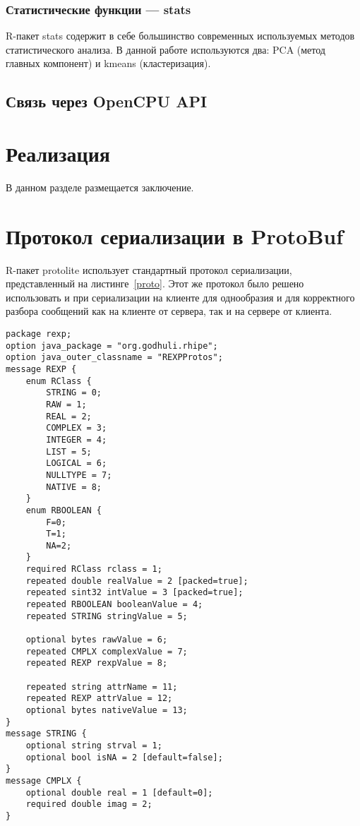 \documentclass[specification,annotation]{itmo-student-thesis}
\begin{document}
\subsection{Статистические функции --- stats}
R-пакет stats \cite{stats} содержит в себе большинство современных используемых методов статистического анализа.
В данной работе используются два: PCA (метод главных компонент) и kmeans (кластеризация).



\section{Связь через OpenCPU API}
\chapterconclusion

\chapter{Реализация}

\chapterconclusion

\startconclusionpage

В данном разделе размещается заключение.

\printmainbibliography

\appendix
\chapter{Протокол сериализации в ProtoBuf}
R-пакет protolite использует стандартный протокол сериализации, представленный на листинге~\ref{proto}. Этот же протокол было решено использовать и при сериализации на клиенте для однообразия и для корректного разбора сообщений как на клиенте от сервера, так и на сервере от клиента.
\begin{lstlisting}[float=!h,caption={Протокол сериализации R-пакета protolite},label={proto}]
package rexp;
option java_package = "org.godhuli.rhipe";
option java_outer_classname = "REXPProtos";
message REXP {
    enum RClass {
        STRING = 0;
        RAW = 1;
        REAL = 2;
        COMPLEX = 3;
        INTEGER = 4;
        LIST = 5;
        LOGICAL = 6;
        NULLTYPE = 7;
        NATIVE = 8;
    }
    enum RBOOLEAN {
        F=0;
        T=1;
        NA=2;
    }
    required RClass rclass = 1;
    repeated double realValue = 2 [packed=true];
    repeated sint32 intValue = 3 [packed=true];
    repeated RBOOLEAN booleanValue = 4;
    repeated STRING stringValue = 5;

    optional bytes rawValue = 6;
    repeated CMPLX complexValue = 7;
    repeated REXP rexpValue = 8;

    repeated string attrName = 11;
    repeated REXP attrValue = 12;
    optional bytes nativeValue = 13;
}
message STRING {
    optional string strval = 1;
    optional bool isNA = 2 [default=false];
}
message CMPLX {
    optional double real = 1 [default=0];
    required double imag = 2;
}
\end{lstlisting}
\end{document}
